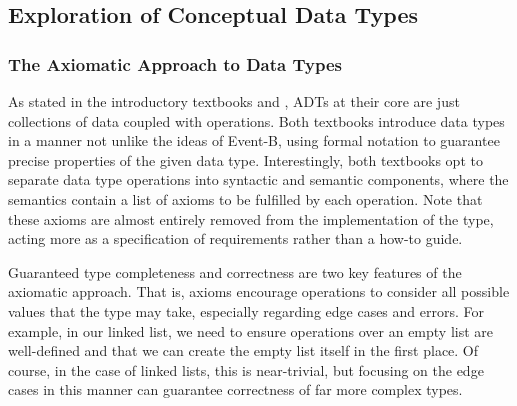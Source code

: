 \documentclass{article}
\begin{document}
\subsection{Exploration of Conceptual Data Types}

\subsubsection{The Axiomatic Approach to Data Types}

As stated in the introductory textbooks \cite{DTandDS} and \cite{ADTspec}, ADTs at their core are just collections of
data coupled with operations. Both textbooks introduce data types in a manner not unlike the ideas of Event-B,
using formal notation to guarantee precise properties of the given data type. Interestingly, both textbooks
opt to separate data type operations into syntactic and semantic components, where the semantics
contain a list of axioms to be fulfilled by each operation. Note that these axioms are almost entirely removed
from the implementation of the type, acting more as a specification of requirements rather than a how-to guide.

Guaranteed type completeness and correctness are two key features of the axiomatic approach. That is, axioms
encourage operations to consider all possible values that the type may take, especially regarding edge cases and errors.
For example, in our linked list, we need to ensure operations over an empty list are well-defined and that we can
create the empty list itself in the first place. Of course, in the case of linked lists, this is near-trivial,
but focusing on the edge cases in this manner can guarantee correctness of far more complex types.
\end{document}
